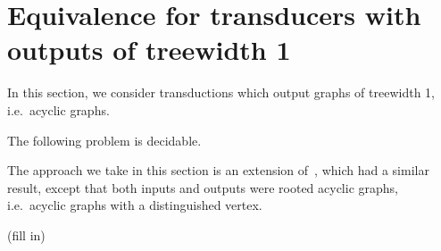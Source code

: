 
\section{Equivalence for transducers with outputs of treewidth 1}
In this section, we consider transductions which output graphs of treewidth 1, i.e.~acyclic graphs. 

\begin{theorem} The following problem is decidable.
\end{theorem}

The approach we take in this section is an extension of~\cite[Section 3.3]{boiretReducingTransducerEquivalence2018}, which had a similar result, except that both inputs and outputs were rooted acyclic graphs, i.e.~acyclic graphs with a distinguished vertex. 

\begin{center}
    (fill in)
\end{center}
